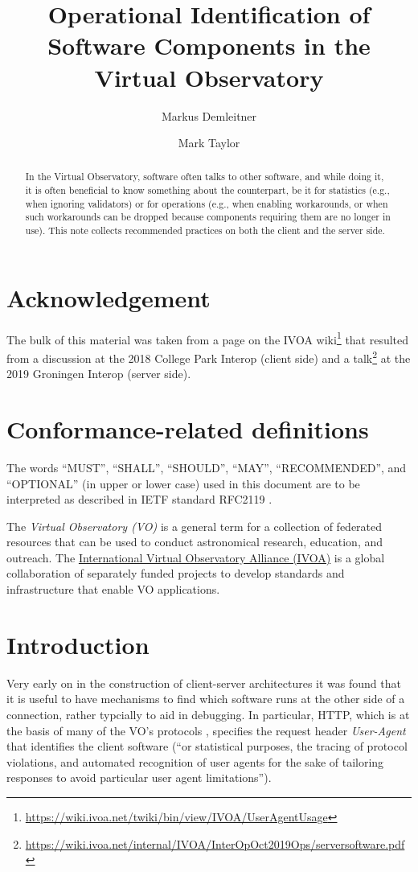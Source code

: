 \documentclass[11pt,a4paper]{ivoa}
\title{Operational Identification of Software Components in the Virtual
Observatory}
\author[https://wiki.ivoa.net/twiki/bin/view/IVOA/WebHome?topic=MarkusDemleitner]{Markus
Demleitner}
\author[https://wiki.ivoa.net/twiki/bin/view/IVOA/MarkusDemleitner?topic=MarkTaylor]{Mark
Taylor}
\begin{document}
\begin{abstract}
In the Virtual Observatory, software often talks to other software, and
while doing it, it is often beneficial to know something about the
counterpart, be it for statistics (e.g., when ignoring validators) or
for operations (e.g., when enabling workarounds, or when such
workarounds can be dropped because components requiring them are no
longer in use).  This note collects recommended practices on both the
client and the server side.
\end{abstract}

\section*{Acknowledgement}

The bulk of this material was taken from a page on the IVOA
wiki\footnote{\url{https://wiki.ivoa.net/twiki/bin/view/IVOA/UserAgentUsage}}
that resulted from a discussion at the 2018 College Park Interop (client
side) and a
talk\footnote{\url{https://wiki.ivoa.net/internal/IVOA/InterOpOct2019Ops/serversoftware.pdf}}
at the 2019 Groningen Interop (server side).


\section*{Conformance-related definitions}

The words ``MUST'', ``SHALL'', ``SHOULD'', ``MAY'', ``RECOMMENDED'', and
``OPTIONAL'' (in upper or lower case) used in this document are to be
interpreted as described in IETF standard RFC2119 \citep{std:RFC2119}.

The \emph{Virtual Observatory (VO)} is a
general term for a collection of federated resources that can be used
to conduct astronomical research, education, and outreach.
The \href{http://www.ivoa.net}{International
Virtual Observatory Alliance (IVOA)} is a global
collaboration of separately funded projects to develop standards and
infrastructure that enable VO applications.


\section{Introduction}

Very early on in the construction of client-server architectures it was
found that it is useful to have mechanisms to find which software runs
at the other side of a connection, rather typcially to aid in debugging.
In particular, HTTP, which is at the basis of many of the VO's protocols
\citep{std:HTTP}, specifies the request header \emph{User-Agent} that
identifies the client software (``or statistical purposes, the tracing
of protocol violations, and automated recognition of user agents for the
sake of tailoring responses to avoid particular user agent
limitations'').
\end{document}
